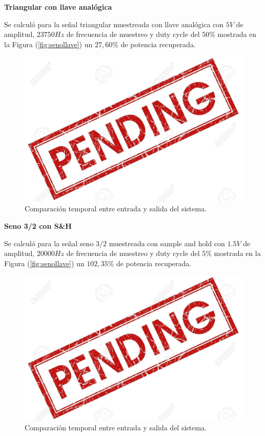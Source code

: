 \textbf{Triangular con llave analógica}

Se calculó para la señal triangular muestreada con llave analógica con $5V$ de amplitud, $23750Hz$ de frecuencia de muestreo y duty cycle del $50\%$ mostrada en la Figura (\ref{fig:senollave}) un $27,60\%$ de potencia recuperada. 

\begin{figure}[H]
\centering
\includegraphics[width=\textwidth]{ImagenesEjercicio6/pend.jpg}
\caption{Comparación temporal entre entrada y salida del sistema.}
\end{figure}

\textbf{Seno 3/2 con S\&H}

Se calculó para la señal seno 3/2 muestreada con sample and hold con $1.5V$ de amplitud, $20000Hz$ de frecuencia de muestreo y duty cycle del $5\%$ mostrada en la Figura (\ref{fig:senollave}) un $102,35\%$ de potencia recuperada. 

\begin{figure}[H]
\centering
\includegraphics[width=\textwidth]{ImagenesEjercicio6/pend.jpg}
\caption{Comparación temporal entre entrada y salida del sistema.}
\end{figure}

